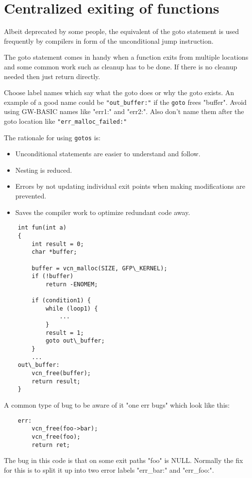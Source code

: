 \documentclass[pdftex,12pt, twocol]{article} %
\begin{document}
\section{Centralized exiting of functions}

Albeit deprecated by some people, the equivalent of the goto statement is
used frequently by compilers in form of the unconditional jump instruction.

The goto statement comes in handy when a function exits from multiple
locations and some common work such as cleanup has to be done.  If there is no
cleanup needed then just return directly.

Choose label names which say what the goto does or why the goto exists.  An
example of a good name could be \verb+"out_buffer:"+ if the \verb+goto+ frees "buffer".  Avoid
using GW-BASIC names like "err1:" and "err2:".  Also don't name them after the
goto location like \verb+"err_malloc_failed:"+

The rationale for using \verb+gotos+ is:
\begin{itemize}
\item Unconditional statements are easier to understand and follow.
\item Nesting is reduced.
\item Errors by not updating individual exit points when making modifications are prevented.
\item Saves the compiler work to optimize redundant code away.
\end{itemize}

\begin{verbatim}
	int fun(int a)
	{
		int result = 0;
		char *buffer;

		buffer = vcn_malloc(SIZE, GFP\_KERNEL);
		if (!buffer)
			return -ENOMEM;

		if (condition1) {
			while (loop1) {
				...
			}
			result = 1;
			goto out\_buffer;
		}
		...
	out\_buffer:
		vcn_free(buffer);
		return result;
	}
\end{verbatim}

A common type of bug to be aware of it "one err bugs" which look like this:

\begin{verbatim}
	err:
		vcn_free(foo->bar);
		vcn_free(foo);
		return ret;
\end{verbatim}

The bug in this code is that on some exit paths "foo" is NULL.  Normally the
fix for this is to split it up into two error labels "err\_bar:" and "err\_foo:".
\end{document}
